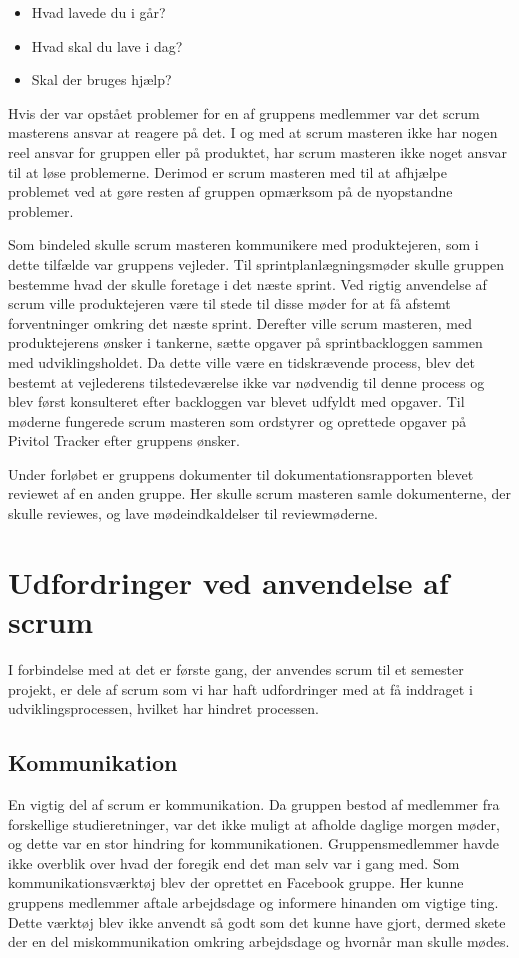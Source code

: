 \begin{itemize}
	\item Hvad lavede du i går?
	\item Hvad skal du lave i dag?
	\item Skal der bruges hjælp?
\end{itemize} 

Hvis der var opstået problemer for en af gruppens medlemmer var det scrum masterens ansvar at reagere på det. I og med at scrum masteren ikke har nogen reel ansvar for gruppen eller på produktet, har scrum masteren ikke noget ansvar til at løse problemerne. Derimod er scrum masteren med til at afhjælpe problemet ved at gøre resten af gruppen opmærksom på de nyopstandne problemer. 

Som bindeled skulle scrum masteren kommunikere med produktejeren, som i dette tilfælde var gruppens vejleder. Til sprintplanlægningsmøder skulle gruppen bestemme hvad der skulle foretage i det næste sprint. Ved rigtig anvendelse af scrum ville produktejeren være til stede til disse møder for at få afstemt forventninger omkring det næste sprint. Derefter ville scrum masteren, med produktejerens ønsker i tankerne, sætte opgaver på sprintbackloggen sammen med udviklingsholdet. Da dette ville være en tidskrævende process, blev det bestemt at vejlederens tilstedeværelse ikke var nødvendig til denne process og blev først konsulteret efter backloggen var blevet udfyldt med opgaver. Til møderne fungerede scrum masteren som ordstyrer og oprettede opgaver på Pivitol Tracker efter gruppens ønsker. \par 
Under forløbet er gruppens dokumenter til dokumentationsrapporten blevet reviewet af en anden gruppe. Her skulle scrum masteren samle dokumenterne, der skulle reviewes, og lave mødeindkaldelser til reviewmøderne.



\section{Udfordringer ved anvendelse af scrum}
I forbindelse med at det er første gang, der anvendes scrum til et semester projekt, er dele af scrum som vi har haft udfordringer med at få inddraget i udviklingsprocessen, hvilket har hindret processen. \newline

\subsection{Kommunikation}
En vigtig del af scrum er kommunikation. Da gruppen bestod af medlemmer fra forskellige studieretninger, var det ikke muligt at afholde daglige morgen møder, og dette var en stor hindring for kommunikationen. Gruppensmedlemmer havde ikke overblik over hvad der foregik end det man selv var i gang med. Som kommunikationsværktøj blev der oprettet en Facebook gruppe. Her kunne gruppens medlemmer aftale arbejdsdage og informere hinanden om vigtige ting. Dette værktøj blev ikke anvendt så godt som det kunne have gjort, dermed skete der en del miskommunikation omkring arbejdsdage og hvornår man skulle mødes. \par

